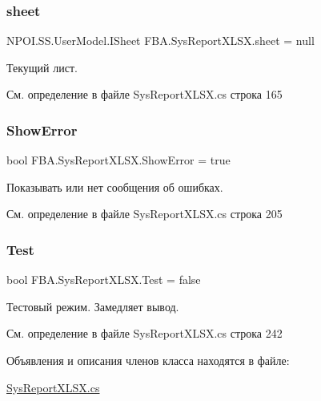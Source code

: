 \subsubsection{\texorpdfstring{sheet}{sheet}}
{\footnotesize\ttfamily N\+P\+O\+I.\+S\+S.\+User\+Model.\+I\+Sheet F\+B\+A.\+Sys\+Report\+X\+L\+S\+X.\+sheet = null}



Текущий лист. 



См. определение в файле Sys\+Report\+X\+L\+S\+X.\+cs строка 165

\mbox{\label{class_f_b_a_1_1_sys_report_x_l_s_x_a3a469063a5d17cb2ff4176e776cdaa1d}} 
\subsubsection{\texorpdfstring{Show\+Error}{ShowError}}
{\footnotesize\ttfamily bool F\+B\+A.\+Sys\+Report\+X\+L\+S\+X.\+Show\+Error = true}



Показывать или нет сообщения об ошибках. 



См. определение в файле Sys\+Report\+X\+L\+S\+X.\+cs строка 205

\mbox{\label{class_f_b_a_1_1_sys_report_x_l_s_x_a738ec4b2907ead0a77b3c9ce3c212d1a}} 
\subsubsection{\texorpdfstring{Test}{Test}}
{\footnotesize\ttfamily bool F\+B\+A.\+Sys\+Report\+X\+L\+S\+X.\+Test = false}



Тестовый режим. Замедляет вывод. 



См. определение в файле Sys\+Report\+X\+L\+S\+X.\+cs строка 242



Объявления и описания членов класса находятся в файле\+:\begin{DoxyCompactItemize}
\item 
\mbox{\hyperlink{_sys_report_x_l_s_x_8cs}{Sys\+Report\+X\+L\+S\+X.\+cs}}\end{DoxyCompactItemize}
